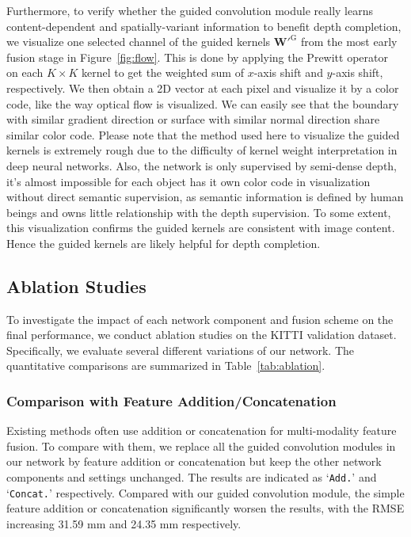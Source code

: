 \documentclass[journal]{IEEEtran}
\begin{document}
Furthermore, to verify whether the guided convolution module really learns content-dependent and spatially-variant information to benefit depth completion,
we visualize one selected channel of the guided kernels $\mathbf{W'}^{\mathrm{G}}$ from the most early fusion stage in Figure~\ref{fig:flow}. 
This is done by applying the Prewitt operator~\cite{prewitt} on each $K \times K$ kernel to get the weighted sum of $x$-axis shift and $y$-axis shift, respectively.
We then obtain a 2D vector at each pixel and visualize it by a color code, like the way optical flow is visualized.
We can easily see that the boundary with similar gradient direction or surface with similar normal direction share similar color code. 
Please note that the method used here to visualize the guided kernels is extremely rough due to the difficulty of kernel weight interpretation in deep neural networks.
Also, the network is only supervised by semi-dense depth,
it's almost impossible for each object has it own color code in visualization without direct semantic supervision,
as semantic information is defined by human beings and owns little relationship with the depth supervision.  
To some extent, this visualization confirms the guided kernels are consistent with image content.
Hence the guided kernels are likely helpful for depth completion.


\subsection{Ablation Studies}
\label{subsec:ablation_studies}
To investigate the impact of each network component and fusion scheme on the final performance, we conduct ablation studies on the KITTI validation dataset.
Specifically, we evaluate several different variations of our network.
The quantitative comparisons are summarized in Table~\ref{tab:ablation}.

\subsubsection{Comparison with Feature Addition/Concatenation}
Existing methods often use addition or concatenation for multi-modality feature fusion.
To compare with them, we replace all the guided convolution modules in our network by feature addition or concatenation but keep the other network components and settings unchanged.
The results are indicated as `\texttt{Add.}' and `\texttt{Concat.}' respectively.
Compared with our guided convolution module, the simple feature addition or concatenation significantly worsen the results,
with the RMSE increasing 31.59 $\mathrm{mm}$ and 24.35 $\mathrm{mm}$ respectively. 
\end{document}
